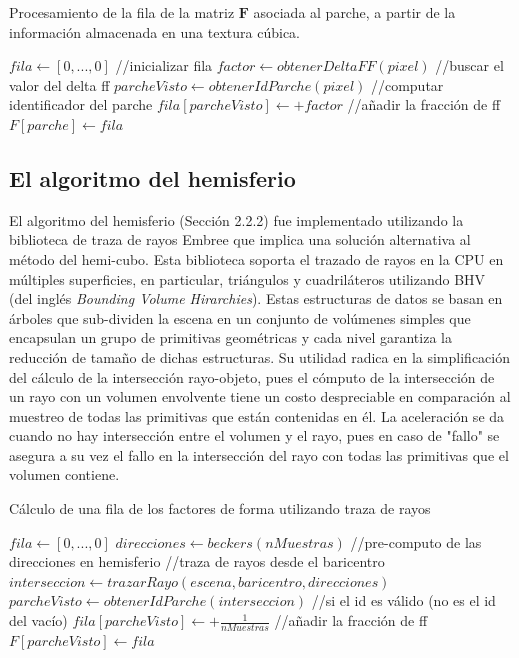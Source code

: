 \begin{algorithm}
\caption{Procesamiento de la fila de la matriz $\mathbf{F}$ asociada al parche, a partir de la información almacenada en una textura cúbica.}
\label{alg:processHemicube}
	\fontsize{8}{8}\selectfont
\begin{algorithmic}
			\State $fila \gets [0,...,0]$ //inicializar fila
				\State $factor \gets obtenerDeltaFF(pixel)$ //buscar el valor del delta ff
				\State $parcheVisto \gets obtenerIdParche(pixel)$ //computar identificador del parche
					\State $fila[parcheVisto] \gets + factor$ //añadir la fracción de ff
				\EndIf
			\EndLoop
			\State $F[parche] \gets  fila$
		\EndFunction
\end{algorithmic}
\end{algorithm}

\subsection{El algoritmo del hemisferio}
El algoritmo del hemisferio (Sección 2.2.2) fue implementado utilizando la biblioteca de traza de rayos Embree que implica una solución alternativa al método del hemi-cubo. Esta biblioteca soporta el trazado de rayos en la CPU en múltiples superficies, en particular, triángulos y cuadriláteros utilizando BHV (del inglés \textit{Bounding Volume Hirarchies}). Estas estructuras de datos se basan en árboles que sub-dividen la escena en un conjunto de volúmenes simples que encapsulan un grupo de primitivas geométricas y cada nivel garantiza la reducción de tamaño de dichas estructuras. Su utilidad radica en la simplificación del cálculo de la intersección rayo-objeto, pues el cómputo de la intersección de un rayo con un volumen envolvente tiene un costo despreciable en comparación al muestreo de todas las primitivas que están contenidas en él. La aceleración se da cuando no hay intersección entre el volumen y el rayo, pues en caso de "fallo" se asegura a su vez el fallo en la intersección del rayo con todas las primitivas que el volumen contiene.

\begin{algorithm}
	\caption{Cálculo de una fila de los factores de forma utilizando traza de rayos}
	\label{alg:computeff}
	\fontsize{8}{8}\selectfont
	\begin{algorithmic}
			\State $fila \gets [0,...,0]$
			\State $direcciones \gets beckers(nMuestras)$ //pre-computo de las direcciones en hemisferio
			//traza de rayos desde el baricentro
			\State $interseccion \gets trazarRayo(escena, baricentro, direcciones)$ 
			\State $parcheVisto \gets obtenerIdParche(interseccion)$
			//si el id es válido (no es el id del vacío)
			\State $fila[parcheVisto] \gets + \frac{1}{nMuestras}$ //añadir la fracción de ff
			\EndIf
			\EndLoop
			\State $F[parcheVisto] \gets  fila$
		\EndFunction
	\end{algorithmic}
\end{algorithm}

